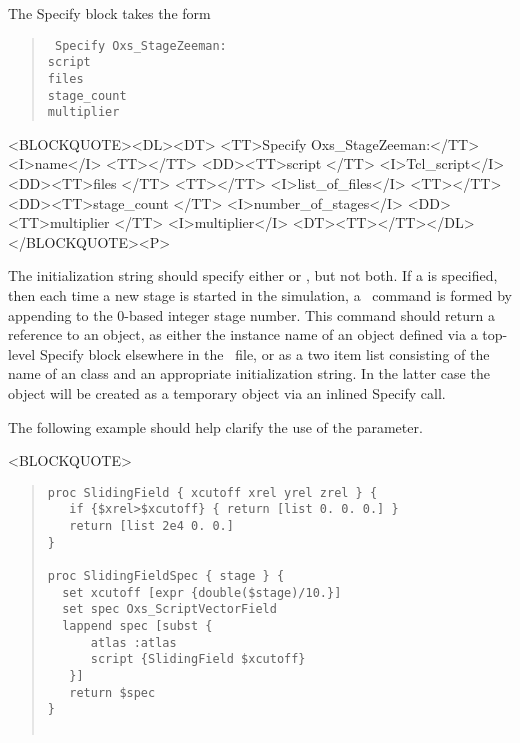 \begin{description}
   The Specify block takes the form
      \begin{latexonly}
      \begin{quote}\tt
      Specify Oxs\_StageZeeman: \ocb\\
       \bi script \\
       \bi files \ocb{}\ccb\\
       \bi stage\_count  \\
       \bi multiplier \\
      \ccb
      \end{quote}
      \end{latexonly}
      \begin{rawhtml}
      <BLOCKQUOTE><DL><DT>
      <TT>Specify Oxs_StageZeeman:</TT><I>name</I> <TT>{</TT>
      <DD><TT>script </TT> <I>Tcl_script</I>
      <DD><TT>files </TT> <TT>{</TT> <I>list_of_files</I> <TT>}</TT>
      <DD><TT>stage_count </TT> <I>number_of_stages</I>
      <DD><TT>multiplier </TT> <I>multiplier</I>
      <DT><TT>}</TT></DL></BLOCKQUOTE><P>
      \end{rawhtml}
   The initialization string should specify either  or
   , but not both.  If a  is specified,
   then each time a new stage is started in the simulation, a \Tcl\
   command is formed by appending to  the 0-based
   integer stage number.  This command should return a reference to an
   \cd{Oxs\_VectorField} object, as either the instance name of an
   object defined via a top-level Specify block elsewhere in the
   \MIF\ file, or as a two item list consisting of the name of an
    class and an appropriate initialization string.
   In the latter case the \cd{Oxs\_VectorField} object will be created
   as a temporary object via an inlined Specify call.

   The following example should help clarify the use of the 
   parameter.
\begin{rawhtml}
<BLOCKQUOTE>
\end{rawhtml}
\begin{quote}
\begin{verbatim}
proc SlidingField { xcutoff xrel yrel zrel } {
   if {$xrel>$xcutoff} { return [list 0. 0. 0.] }
   return [list 2e4 0. 0.]
}

proc SlidingFieldSpec { stage } {
  set xcutoff [expr {double($stage)/10.}]
  set spec Oxs_ScriptVectorField
  lappend spec [subst {
      atlas :atlas
      script {SlidingField $xcutoff}
   }]
   return $spec
}


\end{verbatim}
\end{quote}
\end{description}
